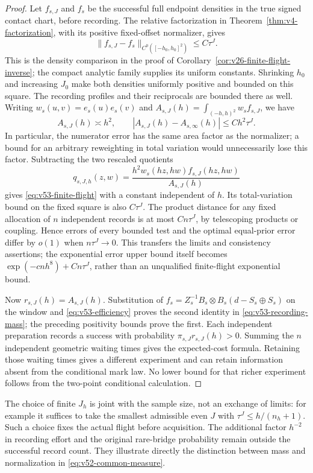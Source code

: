 \begin{proof}
Let $f_{s,J}$ and $f_s$ be the successful full endpoint densities in the
true signed contact chart, before recording.  The relative factorization
in Theorem~\ref{thm:v4-factorization}, with its positive fixed-offset
normalizer, gives
\[
 \|f_{s,J}-f_s\|_{C^0([-h_0,h_0]^2)}\le C\tau^J.
\]
This is the density comparison in the proof of
Corollary~\ref{cor:v26-finite-flight-inverse}; the compact analytic family
supplies its uniform constants.  Shrinking $h_0$ and increasing $J_0$
make both densities uniformly positive and bounded on this square.
The recording profiles and their reciprocals are bounded there as well.
Writing $w_s(u,v)=e_s(u)e_s(v)$ and
$A_{s,J}(h)=\int_{(-h,h)^2}w_sf_{s,J}$, we have
\[
 A_{s,J}(h)\asymp h^2,\qquad
 |A_{s,J}(h)-A_{s,\infty}(h)|\le Ch^2\tau^J.
\]
In particular, the numerator error has the same area factor as the
normalizer; a bound for an arbitrary reweighting in total variation would
unnecessarily lose this factor.  Subtracting the two rescaled quotients
\[
 q_{s,J,h}(z,w)=
 \frac{h^2w_s(hz,hw)f_{s,J}(hz,hw)}{A_{s,J}(h)}
\]
gives \eqref{eq:v53-finite-flight} with a constant independent of $h$.
Its total-variation bound on the fixed square is also $C\tau^J$.
The product distance for any fixed allocation of $n$ independent records
is at most $Cn\tau^J$, by telescoping products or coupling.  Hence errors
of every bounded test and the optimal equal-prior error differ by $o(1)$
when $n\tau^J\to0$.  This transfers the limits and consistency assertions;
the exponential error upper bound itself becomes
$\exp(-cnh^8)+Cn\tau^J$, rather than an unqualified finite-flight
exponential bound.

Now $r_{s,J}(h)=A_{s,J}(h)$.  Substitution of
$f_s=Z_s^{-1}B_s\otimes B_s(d-S_s\oplus S_s)$ on the window and
\eqref{eq:v53-efficiency} proves the second identity in
\eqref{eq:v53-recording-mass}; the preceding positivity bounds prove
the first.  Each independent preparation records a success with
probability $\pi_{s,J}r_{s,J}(h)>0$.  Summing the $n$ independent
geometric waiting times gives the expected-cost formula.  Retaining those
waiting times gives a different experiment and can retain information
absent from the conditional mark law.  No lower bound for that richer
experiment follows from the two-point conditional calculation.
\end{proof}

The choice of finite $J_h$ is joint with the sample size, not an exchange
of limits: for example it suffices to take the smallest admissible even
$J$ with $\tau^J\le h/(n_h+1)$.  Such a choice fixes the actual flight
before acquisition.  The additional factor $h^{-2}$ in recording effort
and the original rare-bridge probability remain outside the successful
record count.  They illustrate directly the distinction between mass and
normalization in \eqref{eq:v52-common-measure}.

